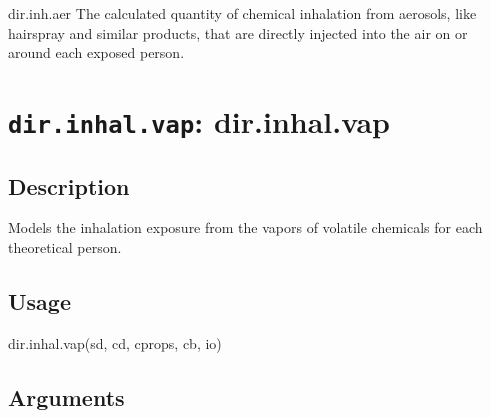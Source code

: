 \documentclass[
]{article}
\newenvironment{Shaded}{\begin{snugshade}}{\end{snugshade}}
\newcommand{\FunctionTok}[1]{\textcolor[rgb]{0.00,0.00,0.00}{#1}}
\newcommand{\NormalTok}[1]{#1}
\begin{document}
dir.inh.aer The calculated quantity of chemical inhalation from
aerosols, like hairspray and similar products, that are directly
injected into the air on or around each exposed person.

\hypertarget{dir.inhal.vap-dir.inhal.vap}{%
\section{\texorpdfstring{\texttt{dir.inhal.vap}:
dir.inhal.vap}{dir.inhal.vap: dir.inhal.vap}}\label{dir.inhal.vap-dir.inhal.vap}}

\hypertarget{description-16}{%
\subsection{Description}\label{description-16}}

Models the inhalation exposure from the vapors of volatile chemicals for
each theoretical person.

\hypertarget{usage-16}{%
\subsection{Usage}\label{usage-16}}

\begin{Shaded}
\begin{Highlighting}[]
\FunctionTok{dir.inhal.vap}\NormalTok{(sd, cd, cprops, cb, io)}
\end{Highlighting}
\end{Shaded}

\hypertarget{arguments-13}{%
\subsection{Arguments}\label{arguments-13}}
\end{document}

